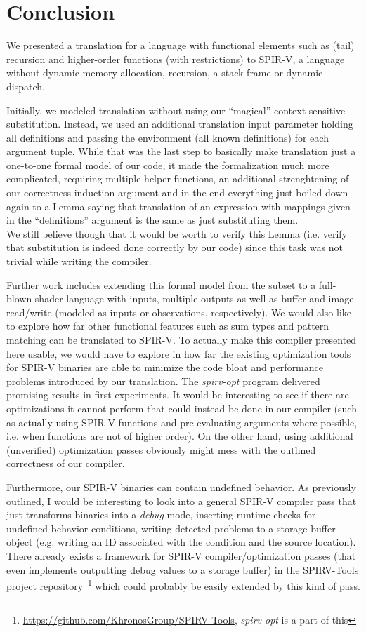 \documentclass[letterpaper,12pt]{article}
\begin{document}
\section{Conclusion}

We presented a translation for a language with functional elements
such as (tail) recursion and higher-order functions (with restrictions)
to SPIR-V, a language without dynamic memory allocation, recursion,
a stack frame or dynamic dispatch.

Initially, we modeled translation without using our ``magical'' 
context-sensitive substitution. Instead, we used an additional
translation input parameter holding all definitions and passing
the environment (all known definitions) for each argument tuple. 
While that was the last step to basically
make translation just a one-to-one formal model of our code, it made
the formalization much more complicated, requiring multiple helper functions,
an additional strenghtening of our correctness induction argument
and in the end everything just boiled down again to a Lemma saying that
translation of an expression with mappings given in the ``definitions''
argument is the same as just substituting them. \\
We still believe though that it would be worth to verify this
Lemma (i.e. verify that substitution is indeed done correctly by our code)
since this task was not trivial while writing the compiler.

Further work includes extending this formal model from the subset
to a full-blown shader language with inputs, multiple outputs as
well as buffer and image read/write (modeled as inputs or observations,
respectively). We would also like to explore how far other functional
features such as sum types and pattern matching can be translated
to SPIR-V. To actually make this compiler presented here usable,
we would have to explore in how far the existing optimization tools
for SPIR-V binaries are able to minimize the code bloat and performance
problems introduced by our translation.
The \textit{spirv-opt} program delivered promising results in first experiments.
It would be interesting to see if there are optimizations it cannot perform
that could instead be done in our compiler (such as actually using SPIR-V
functions and pre-evaluating arguments where possible, i.e. when functions 
are not of higher order). 
On the other hand, using additional (unverified) optimization passes obviously 
might mess with the outlined correctness of our compiler.

Furthermore, our SPIR-V binaries can contain undefined behavior. As previously
outlined, I would be interesting to look into a general SPIR-V compiler 
pass that just transforms binaries
into a \textit{debug} mode, inserting runtime checks for
undefined behavior conditions, writing
detected problems to a storage buffer object (e.g. writing
an ID associated with the condition and the source location).
There already exists a framework for SPIR-V compiler/optimization passes (that even
implements outputting debug values to a storage buffer) in the SPIRV-Tools 
project repository~\footnote{\url{https://github.com/KhronosGroup/SPIRV-Tools},
\textit{spirv-opt} is a part of this} which could probably be easily extended 
by this kind of pass.
\end{document}
